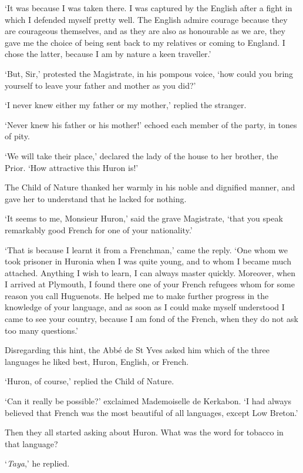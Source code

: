 \documentclass{article}
\begin{document}
\begin{center}
`It was because I was taken there. I was captured by the English after a fight 
in which I defended myself pretty well. The English admire courage because they 
are courageous themselves, and as they are also as honourable as we are, they gave 
me the choice of being sent back to my relatives or coming to England. I chose 
the latter, because I am by nature a keen traveller.' 

`But, Sir,' protested the Magistrate, in his pompous voice, `how could you bring 
yourself to leave your father and mother as you did?' 

`I never knew either my father or my mother,' replied the stranger. 

`Never knew his father or his mother!' echoed each member of the party, in tones 
of pity. 

`We will take their place,' declared the lady of the house to her brother, the 
Prior. `How attractive this Huron is!' 

The Child of Nature thanked her warmly in his noble and dignified manner, and gave 
her to understand that he lacked for nothing. 

`It seems to me, Monsieur Huron,' said the grave Magistrate, `that you speak remarkably 
good French for one of your nationality.' 

`That is because I learnt it from a Frenchman,' came the reply. `One whom we took 
prisoner in Huronia when I was quite young, and to whom I became much attached. 
Anything I wish to learn, I can always master quickly. Moreover, when I arrived 
at Plymouth, I found there one of your French refugees whom for some reason you 
call Huguenots. He helped me to make further progress in the knowledge of your 
language, and as soon as I could make myself understood I came to see your country, 
because I am fond of the French, when they do not ask too many questions.' 

Disregarding this hint, the Abbé de St Yves asked him which of the three languages 
he liked best, Huron, English, or French. 

`Huron, of course,' replied the Child of Nature. 

`Can it really be possible?' exclaimed Mademoiselle de Kerkabon. `I had always 
believed that French was the most beautiful of all languages, except Low Breton.' 

Then they all started asking about Huron. What was the word for tobacco in that 
language? 

`\textit{Taya},' he replied. 


\end{center}
\end{document}
